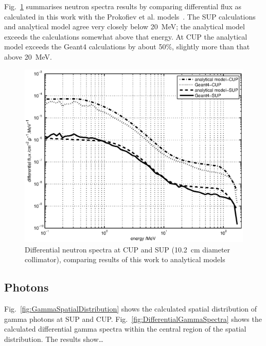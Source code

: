 \documentclass[11pt,a4paper]{IEEEtran}
\let\MYoriglatexcaption\caption
\renewcommand{\caption}[2][\relax]{\MYoriglatexcaption[#2]{#2}}
\begin{document}
Fig.~\ref{fig:DifferentialSpectra} summarises neutron spectra results by comparing differential flux as calculated in this work with the Prokofiev et al. models~\cite{Prokofiev2009,Prokofiev2014}.
The SUP calculations and analytical model agree very closely below \SI{20}{\MeV}; the analytical model exceeds the calculations somewhat above that energy.
At CUP the analytical model exceeds the Geant4 calculations by about 50\%, slightly more than that above \SI{20}{\MeV}.

\begin{figure}[t]
    \centering
    \includegraphics[width=0.9\columnwidth]{DiffYieldComparedSUPCUP10.eps}
    \caption{
        Differential neutron spectra at CUP and SUP (\SI{10.2}{\cm} diameter collimator), comparing results of this work to analytical models~\cite{Prokofiev2009,Prokofiev2014}
    }
    \label{fig:DifferentialSpectra}
\end{figure}

\subsection{Photons}
Fig.~\ref{fig:GammaSpatialDistribution} shows the calculated spatial distribution of gamma photons at SUP and CUP.
Fig.~\ref{fig:DifferentialGammaSpectra} shows the calculated differential gamma spectra within the central region of the spatial distribution.
The results show\ldots
{}
\end{document}
